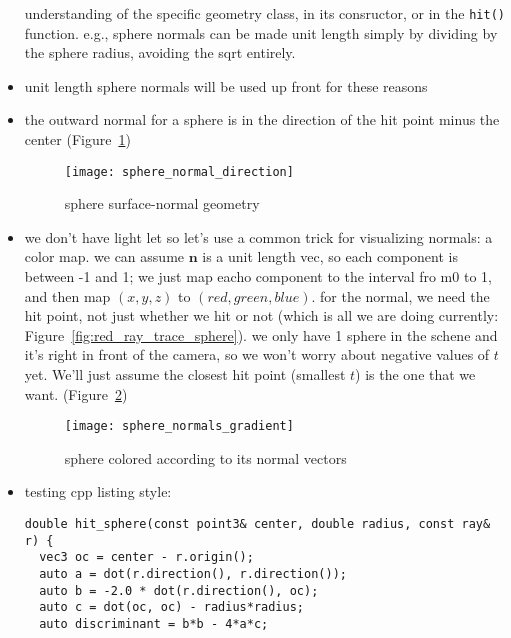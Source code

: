 \begin{itemize}
        understanding of the specific geometry class, in its consructor, or in
        the \texttt{hit()} function. e.g., sphere normals can be made unit
        length simply by dividing by the sphere radius, avoiding the sqrt
        entirely.
    \item unit length sphere normals will be used up front for these reasons
    \item the outward normal for a sphere is in the direction of the hit point
        minus the center (Figure~\ref{fig:sphere_normal_direction})
        \begin{figure}[ht]
            \centering
            \texttt{[image: sphere\_normal\_direction]}
            \captionsetup{labelfont=bf, textfont=it}
            \caption{sphere surface-normal geometry}
            \label{fig:sphere_normal_direction}
        \end{figure}
        
        \clearpage
    \item we don't have light let so let's use a common trick for visualizing
        normals: a color map. we can assume $\mathbf{n}$ is a unit length vec,
        so each component is between -1 and 1; we just map eacho component to
        the interval fro m0 to 1, and then map $(x,y,z)$ to $(red,green,blue)$.
        for the normal, we need the hit point, not just whether we hit or not
        (which is all we are doing currently:
        Figure~\ref{fig:red_ray_trace_sphere}). we only have 1 sphere in the
        schene and it's right in front of the camera, so we won't worry about
        negative values of $t$ yet. We'll just assume the closest hit point
        (smallest $t$) is the one that we want.
        (Figure~\ref{fig:sphere_normals_gradient})
        \begin{figure}[ht]
            \centering
            \texttt{[image: sphere\_normals\_gradient]}
            \captionsetup{labelfont=bf, textfont=it}
            \caption{sphere colored according to its normal vectors}
            \label{fig:sphere_normals_gradient}
        \end{figure}
        \clearpage
    \item testing cpp listing style:
\begin{lstlisting}[style=rosepinestyle]
double hit_sphere(const point3& center, double radius, const ray& r) {
  vec3 oc = center - r.origin();
  auto a = dot(r.direction(), r.direction());
  auto b = -2.0 * dot(r.direction(), oc);
  auto c = dot(oc, oc) - radius*radius;
  auto discriminant = b*b - 4*a*c;
  

\end{lstlisting}
\end{itemize}
